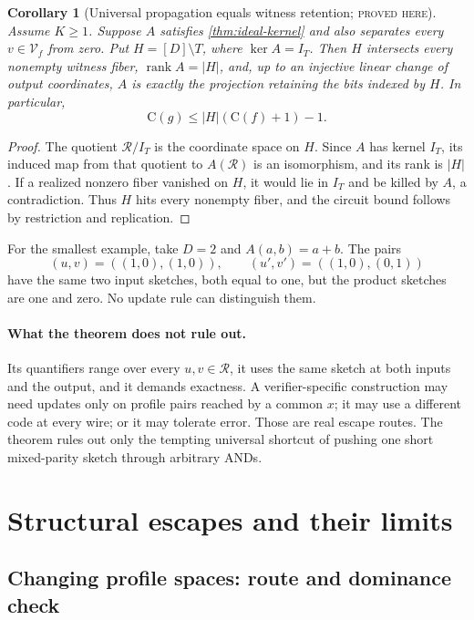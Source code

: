 \documentclass[11pt]{article}
\newtheorem{corollary}[corollary]{Corollary}
\theoremstyle{definition}
\theoremstyle{remark}
\newcommand{\C}{\mathrm C}
\newcommand{\status}[1]{\textsc{#1}}
\begin{document}
\begin{corollary}[Universal propagation equals witness retention;
\status{proved here}]
\label{cor:projection-barrier}
Assume $K\ge1$.  Suppose $A$ satisfies \cref{thm:ideal-kernel} and also separates every
$v\in\mathcal V_f$ from zero.  Put $H=[D]\setminus T$, where
$\ker A=I_T$.  Then $H$ intersects every nonempty witness fiber,
$\operatorname{rank}A=|H|$, and, up to an injective linear change of output
coordinates, $A$ is exactly the projection retaining the bits indexed by
$H$.  In particular,
\[
  \C(g)\le |H|(\C(f)+1)-1.
  \tag{5.3}\label{eq:barrier-hitting}
\]
\end{corollary}

\begin{proof}
The quotient $\mathcal R/I_T$ is the coordinate space on $H$.  Since $A$ has
kernel $I_T$, its induced map from that quotient to $A(\mathcal R)$ is an
isomorphism, and its rank is $|H|$.  If a realized nonzero fiber vanished on
$H$, it would lie in $I_T$ and be killed by $A$, a contradiction.  Thus $H$
hits every nonempty fiber, and the circuit bound follows by restriction and
replication.
\end{proof}

For the smallest example, take $D=2$ and $A(a,b)=a+b$.  The pairs
\[
  (u,v)=((1,0),(1,0)),\qquad
  (u',v')=((1,0),(0,1))
\]
have the same two input sketches, both equal to one, but the product sketches
are one and zero.  No update rule can distinguish them.

\paragraph{What the theorem does not rule out.}
Its quantifiers range over every $u,v\in\mathcal R$, it uses the same sketch
at both inputs and the output, and it demands exactness.  A verifier-specific
construction may need updates only on profile pairs reached by a common $x$;
it may use a different code at every wire; or it may tolerate error.  Those
are real escape routes.  The theorem rules out only the tempting universal
shortcut of pushing one short mixed-parity sketch through arbitrary ANDs.

\section{Structural escapes and their limits}
\label{sec:structural-escapes}

\subsection{Changing profile spaces: route and dominance check}
\end{document}
